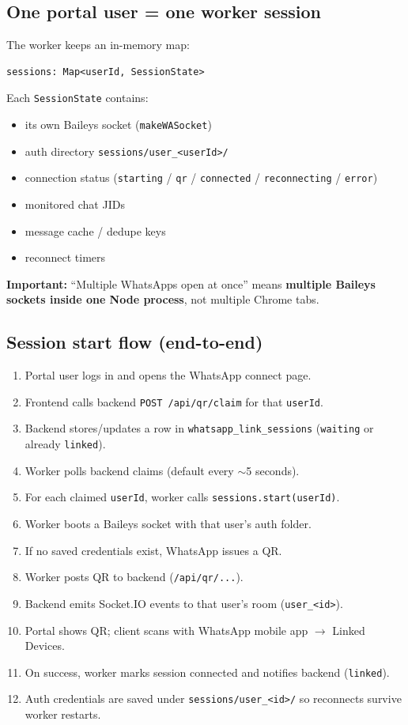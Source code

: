 \documentclass[11pt,a4paper]{article}
\begin{document}
\subsection{One portal user = one worker session}

The worker keeps an in-memory map:

\begin{lstlisting}
sessions: Map<userId, SessionState>
\end{lstlisting}

Each \texttt{SessionState} contains:
\begin{itemize}[leftmargin=1.2em]
  \item its own Baileys socket (\texttt{makeWASocket})
  \item auth directory \texttt{sessions/user\_<userId>/}
  \item connection status (\texttt{starting} / \texttt{qr} / \texttt{connected} / \texttt{reconnecting} / \texttt{error})
  \item monitored chat JIDs
  \item message cache / dedupe keys
  \item reconnect timers
\end{itemize}

\textbf{Important:} ``Multiple WhatsApps open at once'' means \textbf{multiple Baileys sockets inside one Node process}, not multiple Chrome tabs.

\subsection{Session start flow (end-to-end)}

\begin{enumerate}[leftmargin=1.4em]
  \item Portal user logs in and opens the WhatsApp connect page.
  \item Frontend calls backend \texttt{POST /api/qr/claim} for that \texttt{userId}.
  \item Backend stores/updates a row in \texttt{whatsapp\_link\_sessions} (\texttt{waiting} or already \texttt{linked}).
  \item Worker polls backend claims (default every $\sim$5 seconds).
  \item For each claimed \texttt{userId}, worker calls \texttt{sessions.start(userId)}.
  \item Worker boots a Baileys socket with that user's auth folder.
  \item If no saved credentials exist, WhatsApp issues a QR.
  \item Worker posts QR to backend (\texttt{/api/qr/...}).
  \item Backend emits Socket.IO events to that user's room (\texttt{user\_<id>}).
  \item Portal shows QR; client scans with WhatsApp mobile app $\rightarrow$ Linked Devices.
  \item On success, worker marks session connected and notifies backend (\texttt{linked}).
  \item Auth credentials are saved under \texttt{sessions/user\_<id>/} so reconnects survive worker restarts.
\end{enumerate}
\end{document}
